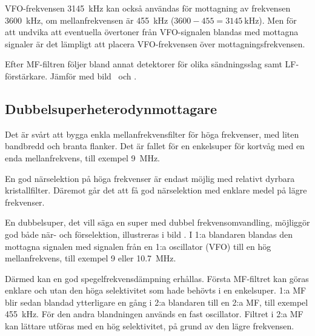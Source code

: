 \begin{tcolorbox}[title=Exempel]
VFO-frekvensen \qty{3145}{\kilo\hertz} kan också användas för mottagning av
frekvensen \qty{3600}{\kilo\hertz}, om mellanfrekvensen är \qty{455}{\kilo\hertz}
(\(3600 - 455 = \qty{3145}{\kilo\hertz}\)).
Men för att undvika att eventuella övertoner från VFO-signalen blandas med
mottagna signaler är det lämpligt att placera VFO-frekvensen över
mottagningsfrekvensen.
\end{tcolorbox}

Efter MF-filtren följer bland annat detektorer för olika sändningsslag samt
LF-förstärkare.
Jämför med bild~ och .

\subsection{Dubbelsuperheterodynmottagare}

Det är svårt att bygga enkla mellanfrekvensfilter för höga frekvenser,
med liten bandbredd och branta flanker.
Det är fallet för en enkelsuper för kortvåg med en enda mellanfrekvens, till
exempel \qty{9}{\mega\hertz}.

En god närselektion på höga frekvenser är endast möjlig med relativt
dyrbara kristallfilter.
Däremot går det att få god närselektion med enklare medel på lägre frekvenser.

En dubbelsuper, det vill säga en super med dubbel frekvensomvandling,
möjliggör god både när- och förselektion, illustreras i bild
.
I 1:a blandaren blandas den mottagna signalen med signalen från en 1:a
oscillator (VFO) till en hög mellanfrekvens, till exempel 9 eller
\qty{10,7}{\mega\hertz}.

Därmed kan en god spegelfrekvensdämpning erhållas.
Första MF-filtret kan göras enklare och utan den höga selektivitet som hade
behövts i en enkelsuper.
1:a MF blir sedan blandad ytterligare en gång i 2:a blandaren till en 2:a MF,
till exempel \qty{455}{\kilo\hertz}.
För den andra blandningen används en fast oscillator.
Filtret i 2:a MF kan lättare utföras med en hög selektivitet, på grund av den
lägre frekvensen.


